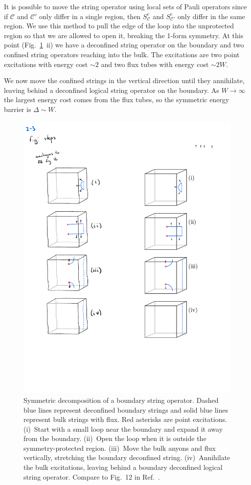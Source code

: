 \documentclass[twocolumn, longbibliography]{revtex4-2}
\newcommand{\C}{\mathcal{C}}
\begin{document}
It is possible to move the string operator using local sets of Pauli operators since if $\C$ and $\C'$ only differ in a single region, then $S^e_\C$ and $S^e_{\C'}$ only differ in the same region. We use this method to pull the edge of the loop into the unprotected region so that we are allowed to open it, breaking the 1-form symmetry. At this point (Fig.~\ref{fig:steps}~ii) we have a deconfined string operator on the boundary and two confined string operators reaching into the bulk. The excitations are two point excitations with energy cost $\sim 2$ and two flux tubes with energy cost $\sim 2W$.

We now move the confined strings in the vertical direction until they annihilate, leaving behind a deconfined logical string operator on the boundary. As $W\to \infty$ the largest energy cost comes from the flux tubes, so the symmetric energy barrier is $\Delta\sim W$.

\begin{figure}
\centering
\includegraphics{steps}
\caption{Symmetric decomposition of a boundary string operator. Dashed blue lines represent deconfined boundary strings and solid blue lines represent bulk strings with flux. Red asterisks are point excitations. (i)~Start with a small loop near the boundary and expand it away from the boundary. (ii)~Open the loop when it is outside the symmetry-protected region. (iii)~Move the bulk anyons and flux vertically, stretching the boundary deconfined string. (iv)~Annihilate the bulk excitations, leaving behind a boundary deconfined logical string operator. Compare to Fig.~12 in Ref.~\cite{RobertsBartlett}.}
\label{fig:steps}
\end{figure}
	
\end{document}
